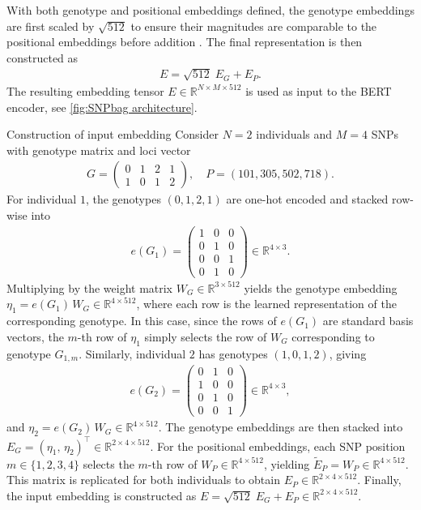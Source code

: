 With both genotype and positional embeddings defined, the genotype embeddings are first scaled by $\sqrt{512}$ to ensure their magnitudes are comparable to the positional embeddings before addition \citep{AttentionIsAllYouNeed}. The final representation is then constructed as
\begin{align}\label{eq: embedding}
    E = \sqrt{512}\; E_G + E_P.
\end{align}
The resulting embedding tensor $E \in \mathbb{R}^{N \times M \times 512}$ is used as input to the BERT encoder, see \autoref{fig:SNPbag architecture}\citep{Xu2025-kj}.

\begin{exmp}{Construction of input embedding}
Consider $N = 2$ individuals and $M = 4$ SNPs with genotype matrix and loci vector
\begin{align*}
    G = \begin{pmatrix} 0 & 1 & 2 & 1 \\ 1 & 0 & 1 & 2 \end{pmatrix}, \quad P = (101, 305, 502, 718).
\end{align*}
For individual $1$, the genotypes $(0, 1, 2, 1)$ are one-hot encoded and stacked row-wise into
\begin{align*}
    e(G_1) = \begin{pmatrix} 1 & 0 & 0 \\ 0 & 1 & 0 \\ 0 & 0 & 1 \\ 0 & 1 & 0 \end{pmatrix} \in \mathbb{R}^{4 \times 3}.
\end{align*}
Multiplying by the weight matrix $W_G \in \mathbb{R}^{3 \times 512}$ yields the genotype embedding $\eta_1 = e(G_1)\, W_G \in \mathbb{R}^{4 \times 512}$, where each row is the learned representation of the corresponding genotype. In this case, since the rows of $e(G_1)$ are standard basis vectors, the $m$-th row of $\eta_1$ simply selects the row of $W_G$ corresponding to genotype $G_{1,m}$.
Similarly, individual $2$ has genotypes $(1, 0, 1, 2)$, giving
\begin{align*}
    e(G_2) = \begin{pmatrix} 0 & 1 & 0 \\ 1 & 0 & 0 \\ 0 & 1 & 0 \\ 0 & 0 & 1 \end{pmatrix} \in \mathbb{R}^{4 \times 3},
\end{align*}
and $\eta_2 = e(G_2)\, W_G \in \mathbb{R}^{4 \times 512}$. The genotype embeddings are then stacked into $E_G = (\eta_1,\, \eta_2)^\top \in \mathbb{R}^{2 \times 4 \times 512}$.
For the positional embeddings, each SNP position $m \in \{1, 2, 3, 4\}$ selects the $m$-th row of $W_P \in \mathbb{R}^{4 \times 512}$, yielding $\tilde{E}_P = W_P \in \mathbb{R}^{4 \times 512}$. This matrix is replicated for both individuals to obtain $E_P \in \mathbb{R}^{2 \times 4 \times 512}$.
Finally, the input embedding is constructed as $E = \sqrt{512}\; E_G + E_P \in \mathbb{R}^{2 \times 4 \times 512}$.
\end{exmp}

